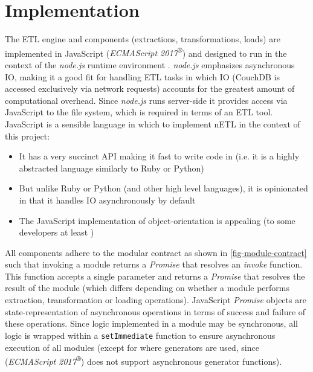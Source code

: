 \section{Implementation}
The ETL engine and components (extractions, transformations, loads) are implemented in JavaScript (\textit{ECMAScript 2017\textsuperscript{®}}) \cite{ecmascript2017} and designed to run in the context of the \textit{node.js} runtime environment \cite{nodejs}. \textit{node.js} emphasizes asynchronous IO, making it a good fit for handling ETL tasks in which IO (CouchDB is accessed exclusively via network requests) accounts for the greatest amount of computational overhead. Since \textit{node.js} runs server-side it provides access via JavaScript to the file system, which is required in terms of an ETL tool. JavaScript is a sensible language in which to implement nETL in the context of this project:

\begin{itemize}
    \item It has a very succinct API making it fast to write code in (i.e. it is a highly abstracted language similarly to Ruby or Python)
    \item But unlike Ruby or Python (and other high level languages), it is opinionated in that it handles IO asynchronously by default
    \item The JavaScript implementation of object-orientation is appealing (to some developers at least \cite{jsBook})
\end{itemize}

All components adhere to the modular contract as shown in \ref{fig-module-contract} such that invoking a module returns a \textit{Promise} \cite{jsPromises} that resolves an \textit{invoke} function. This function accepts a single parameter and returns a \textit{Promise} that resolves the result of the module (which differs depending on whether a module performs extraction, transformation or loading operations). JavaScript \textit{Promise} objects are state-representation of asynchronous operations in terms of success and failure of these operations. Since logic implemented in a module may be synchronous, all logic is wrapped within a \texttt{setImmediate} function to ensure asynchronous execution of all modules (except for where generators are used, since (\textit{ECMAScript 2017\textsuperscript{®}}) does not support asynchronous generator functions).



